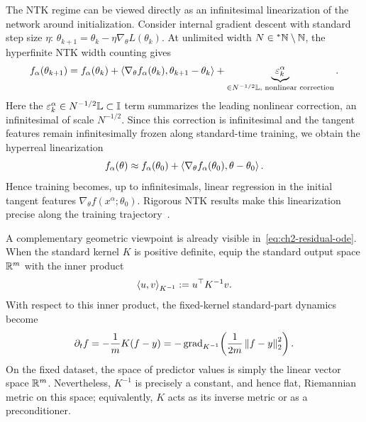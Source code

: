 \begin{remark}\label{rem:ch2-linearization}
The NTK regime can be viewed directly as an infinitesimal linearization of the network around initialization. Consider internal gradient descent with standard step size $\eta$: $\theta_{k+1} = \theta_k - \eta \nabla_\theta L(\theta_k)$. At unlimited width $N \in {}^*\mathbb{N} \setminus \mathbb{N}$, the hyperfinite NTK width counting gives
\begin{equation}\label{eq:ch2-ntk-step-taylor}
f_\alpha(\theta_{k+1}) = f_\alpha(\theta_k) + \left\langle \nabla_\theta f_\alpha(\theta_k), \theta_{k+1} - \theta_k \right\rangle + \underbrace{\varepsilon_k^\alpha}_{\in N^{-1/2}\mathbb{L}\text{, nonlinear correction}}.
\end{equation}
Here the $\varepsilon_k^\alpha \in N^{-1/2}\mathbb{L} \subset \mathbb{I}$ term summarizes the leading nonlinear correction, an infinitesimal of scale $N^{-1/2}$. Since this correction is infinitesimal and the tangent features remain infinitesimally frozen along standard-time training, we obtain the hyperreal linearization
\begin{equation}\label{eq:ch2-ntk-linearized}
f_\alpha(\theta) \approx f_\alpha(\theta_0) + \left\langle \nabla_\theta f_\alpha(\theta_0), \theta - \theta_0 \right\rangle.
\end{equation}
Hence training becomes, up to infinitesimals, linear regression in the initial tangent features $\nabla_\theta f(x^\alpha; \theta_0)$. Rigorous NTK results make this linearization precise along the training trajectory~\cite{lee2019wide}.

A complementary geometric viewpoint is already visible in~\eqref{eq:ch2-residual-ode}. When the standard kernel $K$ is positive definite, equip the standard output space $\mathbb{R}^m$ with the inner product
\begin{equation}\label{eq:ch2-k-inv-metric}
\left\langle u, v \right\rangle_{K^{-1}} := u^\top K^{-1} v.
\end{equation}
With respect to this inner product, the fixed-kernel standard-part dynamics become
\begin{equation}\label{eq:ch2-riemannian-gf}
\partial_t f = -\frac{1}{m} K(f - y) = -\operatorname{grad}_{K^{-1}}\!\left(\frac{1}{2m} \left\lVert f - y \right\rVert_2^2\right).
\end{equation}
On the fixed dataset, the space of predictor values is simply the linear vector space $\mathbb{R}^m$. Nevertheless, $K^{-1}$ is precisely a constant, and hence flat, Riemannian metric on this space; equivalently, $K$ acts as its inverse metric or as a preconditioner.
\end{remark}


